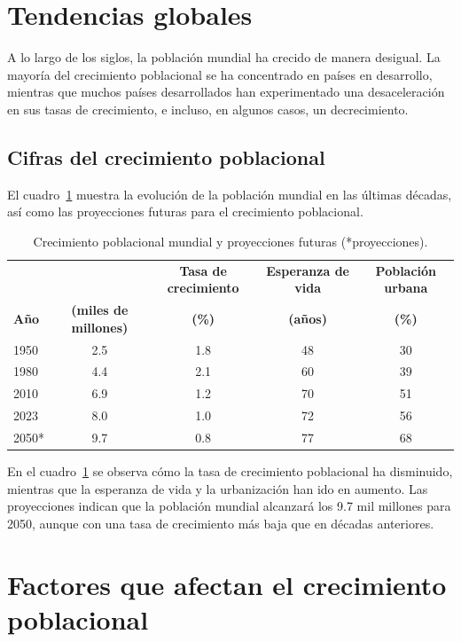 \section{Tendencias globales}

A lo largo de los siglos, la población mundial ha crecido de manera desigual. La mayoría del crecimiento poblacional se ha concentrado en países en desarrollo, mientras que muchos países desarrollados han experimentado una desaceleración en sus tasas de crecimiento, e incluso, en algunos casos, un decrecimiento.

\subsection{Cifras del crecimiento poblacional}

El cuadro~\ref{cuadro1} muestra la evolución de la población mundial en las últimas décadas, así como las proyecciones futuras para el crecimiento poblacional.

\begin{table}[!ht]
\sf\footnotesize\setlength\tabcolsep{4pt}
\centering
\begin{tabular}{l | cccc}
\toprule
& \textbf{Población & \textbf{Tasa de crecimiento} & \textbf{Esperanza de vida} & \textbf{Población urbana} \\
\textbf{Año} & \textbf{(miles de millones)} & \textbf{(\%)} & \textbf{(años)} & \textbf{(\%)} \\
\midrule
1950 & 2.5 & 1.8 & 48 & 30 \\
\midrule
1980 & 4.4 & 2.1 & 60 & 39 \\
\midrule
2010 & 6.9 & 1.2 & 70 & 51 \\
\midrule
2023 & 8.0 & 1.0 & 72 & 56 \\
\midrule
2050* & 9.7 & 0.8 & 77 & 68\\
\bottomrule
\end{tabular}
\caption{Crecimiento poblacional mundial y proyecciones futuras (*proyecciones).}
\label{cuadro1}
\end{table}

En el cuadro~\ref{cuadro1} se observa cómo la tasa de crecimiento poblacional ha disminuido, mientras que la esperanza de vida y la urbanización han ido en aumento. Las proyecciones indican que la población mundial alcanzará los 9.7 mil millones para 2050, aunque con una tasa de crecimiento más baja que en décadas anteriores.

\section{Factores que afectan el crecimiento poblacional}

